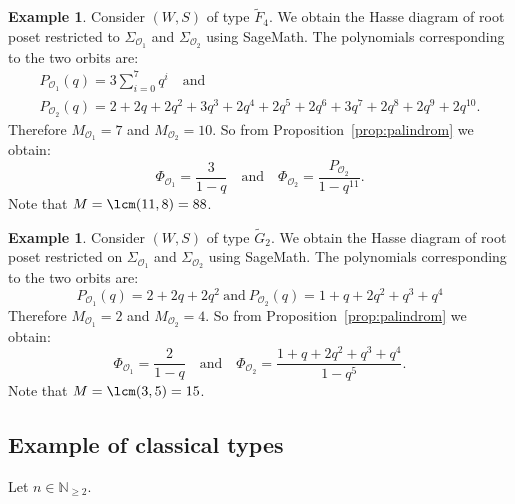 \documentclass{amsart}
\newtheorem{Proposition}[Theorem]{Proposition}
\theoremstyle{definition}
\newtheorem{Example}[Theorem]{Example}
\newcommand{\dep}{\operatorname{dp}}
\newcommand{\mo}{\mathcal{O}}
\begin{document}

\begin{Example}
    Consider $(W,S)$ of type $\widetilde{F}_4$. We obtain the Hasse diagram of root poset restricted to $\Sigma_{\mo_1}$ and $\Sigma_{\mo_2}$ using SageMath. The polynomials corresponding to the two orbits are: 
    \begin{eqnarray*}
        &P_{\mo_1}(q)= 3\sum_{i=0}^7 q^i\quad \mbox{and} &\\
        &  P_{\mo_2}(q)=2+2q+2q^2+3q^3+2q^4+2q^5+2q^6+3q^7+2q^8+2q^9+2q^{10}.&
    \end{eqnarray*}
    Therefore $M_{\mo_1}=7$ and $M_{\mo_2}=10$. So from Proposition~\ref{prop:palindrom} we obtain:
    $$
    \Phi_{\mo_1} =\frac{3}{1-q}\quad \mbox{and} \quad \Phi_{\mo_2} =\frac{P_{\mo_2}}{1-q^{11}}.
    $$
    Note that  $M=\lcm(11,8)=88$.
\end{Example}

\begin{Example}
    Consider $(W,S)$ of type $\widetilde{G}_2$. We obtain the Hasse diagram of root poset restricted on $\Sigma_{\mo_1}$ and $\Sigma_{\mo_2}$ using SageMath. The polynomials corresponding to the two orbits are: 
    $$
        P_{\mo_1}(q)= 2+2q+2q^2\ \mbox{and} \ 
          P_{\mo_2}(q)= 1+q+2q^2+q^3+q^4
    $$
    Therefore $M_{\mo_1}=2$ and $M_{\mo_2}=4$. So from Proposition~\ref{prop:palindrom} we obtain:
    $$
    \Phi_{\mo_1} =\frac{2}{1-q}\quad \mbox{and} \quad \Phi_{\mo_2} =\frac{1+q+2q^2+q^3+q^4}{1-q^{5}}.
    $$
    Note that  $M=\lcm(3,5)=15$.
\end{Example}

\subsection*{Example of classical types}

Let $n\in\mathbb N_{\geq 2}$.
\end{document}
